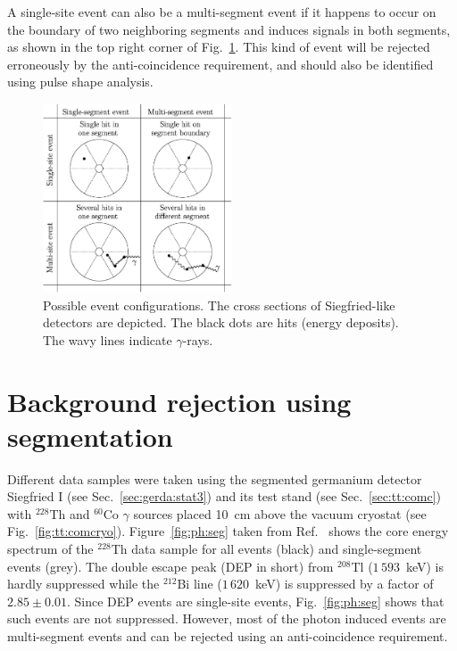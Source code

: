 A single-site event can also be a multi-segment event if it happens to occur on the boundary of two neighboring segments and induces signals in both segments, as shown in the top right corner of Fig.~\ref{fig:ph:eve}. This kind of event will be rejected erroneously by the anti-coincidence requirement, and should also be identified using pulse shape analysis.

\begin{figure}[htbp]
\centering
\includegraphics[width=0.5\textwidth]{events}
\caption{Possible event configurations. The cross sections of Siegfried-like detectors are depicted. The black dots are hits (energy deposits). The wavy lines indicate $\gamma$-rays.}
\label{fig:ph:eve}
\end{figure}

\section{Background rejection using segmentation}
\label{sec:ph:seg}
Different data samples were taken using the segmented germanium detector Siegfried I (see Sec.~\ref{sec:gerda:stat3}) and its test stand (see Sec.~\ref{sec:tt:comc}) with $^{228}$Th and $^{60}$Co $\gamma$ sources placed 10~cm above the vacuum cryostat (see Fig.~\ref{fig:tt:comcryo}). Figure~\ref{fig:ph:seg} taken from Ref.~\cite{Pid07} shows the core energy spectrum of the $^{228}$Th data sample for all events (black) and single-segment events (grey). The double escape peak (DEP in short) from $^{208}$Tl ($1\,593$~keV) is hardly suppressed while the $^{212}$Bi line ($1\,620$~keV) is suppressed by a factor of $2.85 \pm 0.01$. Since DEP events are single-site events, Fig.~\ref{fig:ph:seg} shows that such events are not suppressed. However, most of the photon induced events are multi-segment events and can be rejected using an anti-coincidence requirement.

